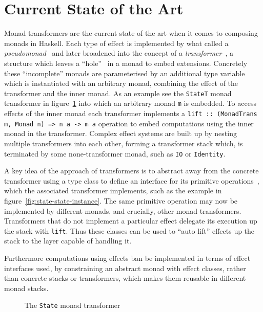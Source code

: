 \section{Current State of the Art}

\label{sec:transformers}

Monad transformers are the current state of the art when it comes to composing
monads in Haskell. Each type of effect is implemented by what
\citeauthor{steele-pseudomonad} called a
\emph{pseudomonad}~\cite{steele-pseudomonad} and \citeauthor{monad-transformers}
later broadened into the concept of a
\emph{transformer}~\cite{monad-transformers}, a structure which leaves a
``hole''~\cite{moggi-hole} in a monad to embed extensions. Concretely these
``incomplete'' monads are parameterised by an additional type variable which is
instantiated with an arbitrary monad, combining the effect of the transformer
and the inner monad. As an example see the \texttt{StateT} monad transformer in
figure~\ref{fig:state-monad} into which an arbitrary monad \texttt{m} is
embedded. To access effects of the inner monad each transformer implements a
\texttt{lift :: (MonadTrans m, Monad n) => n a -> m a} operation to embed
computations using the inner monad in the transformer. Complex effect systems
are built up by nesting multiple transformers into each other, forming a
transformer stack which, is terminated by some none-transformer monad, such as
\texttt{IO} or \texttt{Identity}.

A key idea of the approach of transformers is to abstract away from the concrete
transformer using a type class to define an interface for its primitive
operations~\cite{jones-constructor-classes}, which the associated transformer
implements, such as the example in figure~\ref{fig:state-state-instance}. The
same primitive operation may now be implemented by different monads, and
crucially, other monad transformers. Transformers that do not implement a
particular effect delegate its execution up the stack with \texttt{lift}. Thus
these classes can be used to ``auto lift'' effects up the stack to the layer
capable of handling it.

Furthermore computations using effects ban be implemented in terms of effect
interfaces used, by constraining an abstract monad with effect classes, rather
than concrete stacks or transformers, which makes them reusable in different
monad stacks.

\begin{figure}
  
  \caption{The \texttt{State} monad transformer}
  \label{fig:state-monad}
\end{figure}

